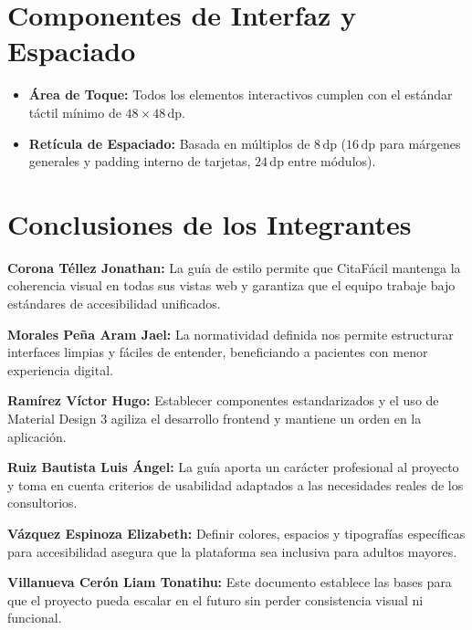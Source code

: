 \documentclass[12pt,a4paper]{article}
\begin{document}
\section{Componentes de Interfaz y Espaciado}
\begin{itemize}[leftmargin=*]
    \item \textbf{Área de Toque:} Todos los elementos interactivos cumplen con el estándar táctil mínimo de $48 \times 48\,\text{dp}$.
    \item \textbf{Retícula de Espaciado:} Basada en múltiplos de $8\,\text{dp}$ ($16\,\text{dp}$ para márgenes generales y padding interno de tarjetas, $24\,\text{dp}$ entre módulos).
\end{itemize}

\section{Conclusiones de los Integrantes}

\textbf{Corona Téllez Jonathan:} La guía de estilo permite que CitaFácil mantenga la coherencia visual en todas sus vistas web y garantiza que el equipo trabaje bajo estándares de accesibilidad unificados.

\textbf{Morales Peña Aram Jael:} La normatividad definida nos permite estructurar interfaces limpias y fáciles de entender, beneficiando a pacientes con menor experiencia digital.

\textbf{Ramírez Víctor Hugo:} Establecer componentes estandarizados y el uso de Material Design 3 agiliza el desarrollo frontend y mantiene un orden en la aplicación.

\textbf{Ruiz Bautista Luis Ángel:} La guía aporta un carácter profesional al proyecto y toma en cuenta criterios de usabilidad adaptados a las necesidades reales de los consultorios.

\textbf{Vázquez Espinoza Elizabeth:} Definir colores, espacios y tipografías específicas para accesibilidad asegura que la plataforma sea inclusiva para adultos mayores.

\textbf{Villanueva Cerón Liam Tonatihu:} Este documento establece las bases para que el proyecto pueda escalar en el futuro sin perder consistencia visual ni funcional.

\end{document}
